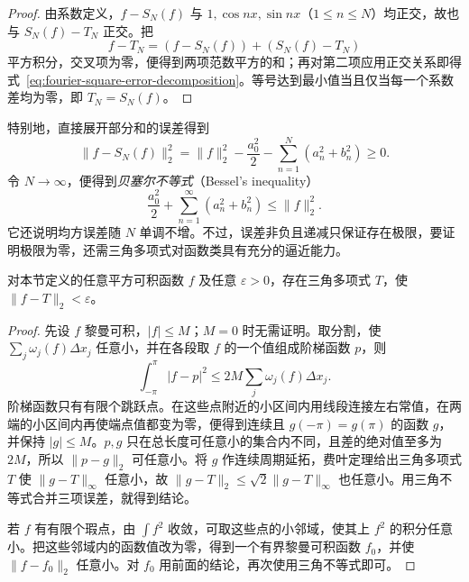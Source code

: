 \documentclass[UTF8,12pt,a4paper,fontset=fandol]{ctexbook}
\begin{document}
\begin{proof}
由系数定义，$f-S_N(f)$ 与 $1,\cos nx,\sin nx$（$1\leq n\leq N$）均正交，故也与 $S_N(f)-T_N$ 正交。把
\[
    f-T_N=(f-S_N(f))+(S_N(f)-T_N)
\]
平方积分，交叉项为零，便得到两项范数平方的和；再对第二项应用正交关系即得式~\eqref{eq:fourier-square-error-decomposition}。等号达到最小值当且仅当每一个系数差均为零，即 $T_N=S_N(f)$。
\end{proof}

特别地，直接展开部分和的误差得到
\begin{equation}
    \|f-S_N(f)\|_2^2
       =\|f\|_2^2-\frac{a_0^2}{2}
                          -\sum_{n=1}^N(a_n^2+b_n^2)\geq0.
    \label{eq:fourier-residual-energy}
\end{equation}
令 $N\to\infty$，便得到\emph{贝塞尔不等式}（Bessel's inequality）
\begin{equation}
    \frac{a_0^2}{2}+\sum_{n=1}^\infty(a_n^2+b_n^2)\leq\|f\|_2^2.
    \label{eq:bessel-fourier-inequality}
\end{equation}
它还说明均方误差随 $N$ 单调不增。不过，误差非负且递减只保证存在极限，要证明极限为零，还需三角多项式对函数类具有充分的逼近能力。

\begin{lemma}[平方可积函数的三角多项式逼近]
\label{lem:trigonometric-density-square-integral}
对本节定义的任意平方可积函数 $f$ 及任意 $\varepsilon>0$，存在三角多项式 $T$，使 $\|f-T\|_2<\varepsilon$。
\end{lemma}

\begin{proof}
先设 $f$ 黎曼可积，$|f|\leq M$；$M=0$ 时无需证明。取分割，使 $\sum_j\omega_j(f)\Delta x_j$ 任意小，并在各段取 $f$ 的一个值组成阶梯函数 $p$，则
\[
    \int_{-\pi}^{\pi}|f-p|^2
       \leq2M\sum_j\omega_j(f)\Delta x_j.
\]
阶梯函数只有有限个跳跃点。在这些点附近的小区间内用线段连接左右常值，在两端的小区间内再使端点值都变为零，便得到连续且 $g(-\pi)=g(\pi)$ 的函数 $g$，并保持 $|g|\leq M$。$p,g$ 只在总长度可任意小的集合内不同，且差的绝对值至多为 $2M$，所以 $\|p-g\|_2$ 可任意小。将 $g$ 作连续周期延拓，费叶定理给出三角多项式 $T$ 使 $\|g-T\|_\infty$ 任意小，故 $\|g-T\|_2\leq\sqrt2\|g-T\|_\infty$ 也任意小。用三角不等式合并三项误差，就得到结论。

若 $f$ 有有限个瑕点，由 $\int f^2$ 收敛，可取这些点的小邻域，使其上 $f^2$ 的积分任意小。把这些邻域内的函数值改为零，得到一个有界黎曼可积函数 $f_0$，并使 $\|f-f_0\|_2$ 任意小。对 $f_0$ 用前面的结论，再次使用三角不等式即可。
\end{proof}
\end{document}
